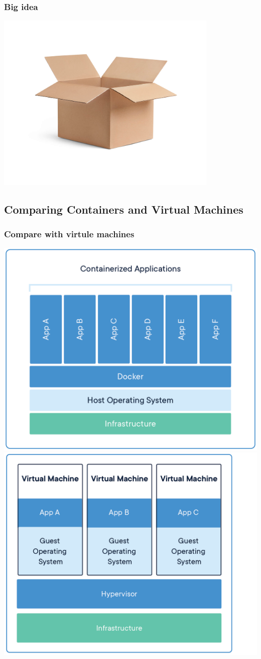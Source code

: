 \documentclass{beamer}
\begin{document}
\begin{frame}
    \frametitle{Big idea}
    \centering
    \includegraphics[width=0.8\textwidth]{box.jpg}
    \cite{box_graph}
\end{frame}

\subsection{Comparing Containers and Virtual Machines}
\begin{frame}
    \frametitle{Compare with virtule machines}
    \begin{center}
        \includegraphics[width=.49\textwidth]{docker_what_is_container.png}
        \includegraphics[width=.5\textwidth]{container-vm-whatcontainer_2.png}
    \end{center}
\end{frame}
\end{document}
